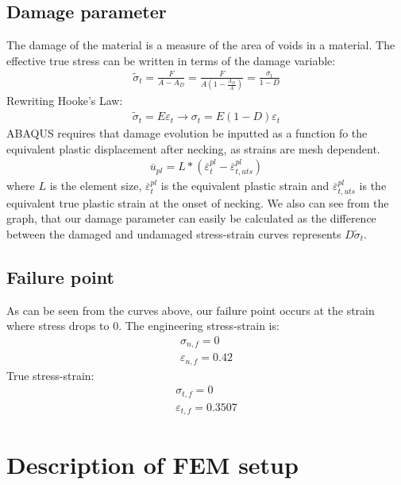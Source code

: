 \documentclass[11pt]{article}
\numberwithin{equation}{section}
\begin{document}
\subsection{Damage parameter}
The damage of the material is a measure of the area of voids in a material. The effective true stress can be written in terms of the damage variable:
\begin{align}
    \widetilde{\sigma}_t = \frac{F}{A-A_D} = \frac{F}{A\left(1 - \frac{A_D}{A}\right)} = \frac{\sigma_t}{1 - D}
\end{align}
Rewriting Hooke's Law:
\begin{gather}
    \widetilde{\sigma}_t = E \varepsilon_t \rightarrow \sigma_t = E\left(1-D\right)\varepsilon_t
\end{gather}
ABAQUS requires that damage evolution be inputted as a function fo the equivalent plastic displacement after necking, as strains are mesh dependent.
\begin{gather}
    \overline{u}_{pl} = L*\left(\overline{\varepsilon}^{pl}_t - \overline{\varepsilon}^{pl}_{t,uts}\right)
\end{gather}
where $L$ is the element size, $\overline{\varepsilon}^{pl}_t$ is the equivalent plastic strain and $\overline{\varepsilon}^{pl}_{t,uts}$ is the equivalent true plastic strain at the onset of necking. We also can see from the graph, that our damage parameter can easily be calculated as the difference between the damaged and undamaged stress-strain curves represents $D\widetilde{\sigma}_t$.
\subsection{Failure point}
As can be seen from the curves above, our failure point occurs at the strain where stress drops to 0. The engineering stress-strain is:
\begin{gather}
    \sigma_{n,f} = 0\\
    \varepsilon_{n,f} = 0.42
\end{gather}
True stress-strain:
\begin{gather}
    \sigma_{t,f} = 0\\
    \varepsilon_{t,f} = 0.3507
\end{gather}
\section{Description of FEM setup}
\end{document}
